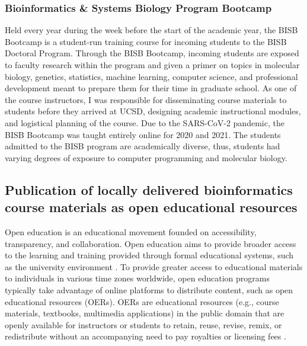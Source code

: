 \subsubsection{Bioinformatics \& Systems Biology Program Bootcamp}
Held every year during the week before the start of the academic year, the BISB Bootcamp is a student-run training course for incoming students to the BISB Doctoral Program. Through the BISB Bootcamp, incoming students are exposed to faculty research within the program and given a primer on topics in molecular biology, genetics, statistics, machine learning, computer science, and professional development meant to prepare them for their time in graduate school. As one of the course instructors, I was responsible for disseminating course materials to students before they arrived at UCSD, designing academic instructional modules, and logistical planning of the course. Due to the SARS-CoV-2 pandemic, the BISB Bootcamp was taught entirely online for 2020 and 2021. The students admitted to the BISB program are academically diverse, thus, students had varying degrees of exposure to computer programming and molecular biology.

\subsection{Publication of locally delivered bioinformatics course materials as open educational resources}

Open education is an educational movement founded on accessibility, transparency, and collaboration. Open education aims to provide broader access to the learning and training provided through formal educational systems, such as the university environment \cite{weller2014,mishra2017,hylen,abri2018,colvard2018}. To provide greater access to educational materials to individuals in various time zones worldwide, open education programs typically take advantage of online platforms to distribute content, such as open educational resources (OERs). OERs are educational resources (e.g., course materials, textbooks, multimedia applications) in the public domain that are openly available for instructors or students to retain, reuse, revise, remix, or redistribute without an accompanying need to pay royalties or licensing fees \cite{islim2016,geith2008,moore2022,colvard2018,abri2018,hylen,mishra2017,weller2014}.  

